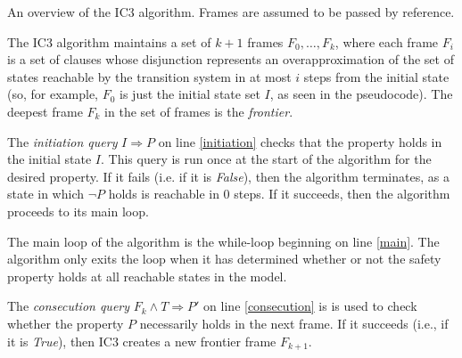 \documentclass[12pt,a4paper,twoside,openright]{report}
\begin{document}
{\begin{algorithm}[!Ht]
\DontPrintSemicolon
{}
\caption{An overview of the IC3 algorithm. Frames are assumed to be passed by reference.}
\label{overview}
\end{algorithm}

The IC3 algorithm maintains a set of $k + 1$ frames $F_0,\ldots,F_k$, where
each frame $F_i$ is a set of clauses whose disjunction represents an
overapproximation of the set of states reachable by the transition
system in at most $i$ steps from the initial state
(so, for example, $F_0$ is just the initial state set $I$, as seen
in the pseudocode).
The deepest frame $F_k$ in the set of frames is the \emph{frontier}.

The \emph{initiation query} $I \Rightarrow P$ on line \ref{initiation} checks that
the property holds in the initial state $I$.
This query is run once at the start of
the algorithm for the desired property.
If it fails (i.e. if it is {\it False}), then the algorithm terminates,
as a state in which $\neg P$ holds is reachable in 0 steps.
If it succeeds, then the algorithm proceeds to its main loop.

The main loop of the algorithm is the while-loop beginning on line \ref{main}.
The algorithm only exits the loop when it has determined whether or not the
safety property holds at all reachable states in the model.

The \emph{consecution query} $F_k \wedge T \Rightarrow P'$ on line \ref{consecution} is
is used to check whether the property $P$ necessarily holds in the next
frame. If it succeeds (i.e., if it is {\it True}), then IC3 creates a new
frontier frame $F_{k + 1}$.

}
\end{document}
